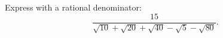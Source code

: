 Express with a rational denominator:
\[
\dfrac{15}{\sqrt{10}+\sqrt{20}+\sqrt{40}-\sqrt{5}-\sqrt{80}} .
\]
